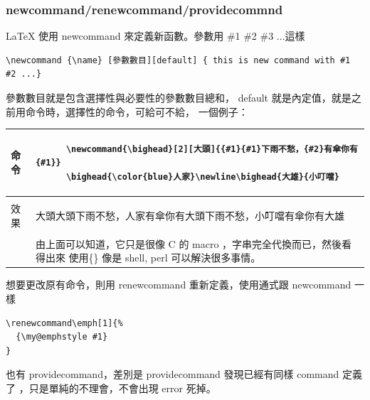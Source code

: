     \subsubsection{newcommand/renewcommand/providecommnd}
    \LaTeX{} 使用 newcommand 來定義新函數。參數用 \#1 \#2 \#3 ...這樣
    \begin{verbatim}
\newcommand {\name} [參數數目][default] { this is new command with #1 #2 ...}
    \end{verbatim}
    參數數目就是包含選擇性與必要性的參數數目總和， default 就是內定值，就是之
    前用命令時，選擇性的命令，可給可不給， 一個例子：
    \begin{flushleft}
      \begin{tabular}{m{}|m{}}
      命令 & 
      \begin{verbatim}
      \newcommand{\bighead}[2][大頭]{{#1}{#1}下雨不愁，{#2}有傘你有{#1}}
      \bighead{\color{blue}人家}\newline\bighead{大雄}{小叮噹}
      \end{verbatim}  \\
      \hline \\[0.2cm]
      效果 &
      \newcommand{\bighead}[2][大頭]{{#1}{#1}下雨不愁，{#2}有傘你有{#1}}
      \bighead{\color{blue}人家}\newline\bighead[大雄]{小叮噹} \\[0.2cm]
      \hline \\[0.2cm]
      &
      由上面可以知道，它只是很像 C 的 macro ，字串完全代換而已，然後看得出來
      使用\{\} 像是 shell, perl 可以解決很多事情。
      \end{tabular}
    \end{flushleft}
    想要更改原有命令，則用 renewcommand 重新定義，使用通式跟 newcommand 一樣
    \begin{verbatim}
\renewcommand\emph[1]{%
  {\my@emphstyle #1}
}
    \end{verbatim}
    也有 providecommand，差別是 providecommand 發現已經有同樣 command 定義了
    ，只是單純的不理會，不會出現 error 死掉。

